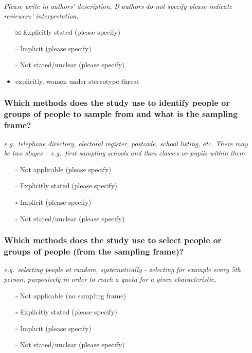\documentclass[
  doc, a4paper]{apa7}
\providecommand{\tightlist}{%
  \setlength{\itemsep}{0pt}\setlength{\parskip}{0pt}}
\begin{document}
\emph{Please write in authors' description. If authors do not specify please indicate reviewers' interpretation.}

\begin{itemize}
\item[$\boxtimes$]
  Explicitly stated (please specify)
\item[$\square$]
  Implicit (please specify)
\item[$\square$]
  Not stated/unclear (please specify)
\item
  explicitly, women under stereotype threat
\end{itemize}

\subsubsection{Which methods does the study use to identify people or groups of people to sample from and what is the sampling frame?}\label{which-methods-does-the-study-use-to-identify-people-or-groups-of-people-to-sample-from-and-what-is-the-sampling-frame}

\emph{e.g.~telephone directory, electoral register, postcode, school listing, etc. There may be two stages -- e.g.~first sampling schools and then classes or pupils within them.}

\begin{itemize}
\tightlist
\item[$\square$]
  Not applicable (please specify)
\item[$\square$]
  Explicitly stated (please specify)
\item[$\square$]
  Implicit (please specify)
\item[$\square$]
  Not stated/unclear (please specify)
\end{itemize}

\subsubsection{Which methods does the study use to select people or groups of people (from the sampling frame)?}\label{which-methods-does-the-study-use-to-select-people-or-groups-of-people-from-the-sampling-frame}

\emph{e.g.~selecting people at random, systematically - selecting for example every 5th person, purposively in order to reach a quota for a given characteristic.}

\begin{itemize}
\tightlist
\item[$\square$]
  Not applicable (no sampling frame)
\item[$\square$]
  Explicitly stated (please specify)
\item[$\square$]
  Implicit (please specify)
\item[$\square$]
  Not stated/unclear (please specify)
\end{itemize}
\end{document}
